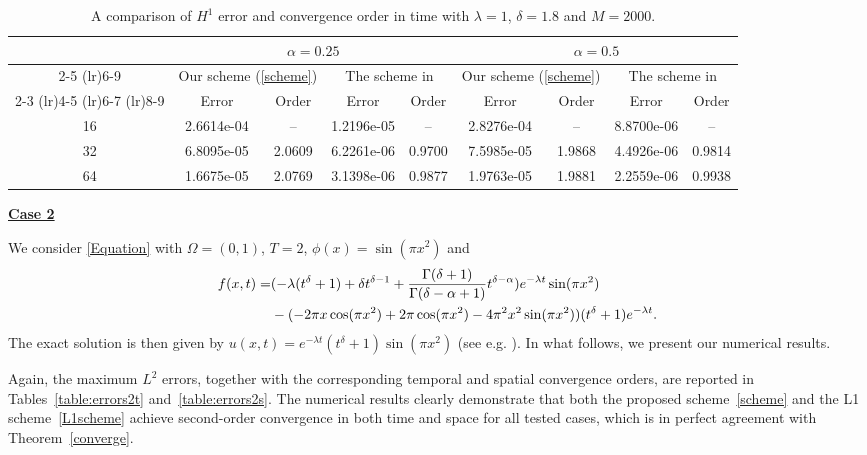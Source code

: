 \documentclass[10pt, reqno]{amsart}
\theoremstyle{remark}
\theoremstyle{definition}
\numberwithin{table}{section}
\begin{document}
\begin{table}[htbp]
\centering
\caption{A comparison of $H^1$ error and convergence order in time with $\lambda=1$, $\delta=1.8$ and $M=2000$.}
\label{table:errors2.2}
\begin{tabular}{c c c c c c c c c}
\toprule
& \multicolumn{4}{c}{$\alpha=0.25$} 
& \multicolumn{4}{c}{$\alpha=0.5$} \\
\cmidrule(lr){2-5} \cmidrule(lr){6-9}
 & \multicolumn{2}{c}{Our scheme (\ref{scheme})} & \multicolumn{2}{c}{The scheme in \cite{cao2020}}   
 & \multicolumn{2}{c}{Our scheme (\ref{scheme})} & \multicolumn{2}{c}{The scheme in \cite{cao2020}} \\
\cmidrule(lr){2-3} \cmidrule(lr){4-5} \cmidrule(lr){6-7} \cmidrule(lr){8-9}
\multirow{1}{*}{$N$}
 & Error & Order & Error & Order & Error & Order & Error  & Order \\
\midrule
16 
& 2.6614e-04  & --   
& 1.2196e-05 & -- 
& 2.8276e-04 & -- 
& 8.8700e-06 & -- \\
32 
& 6.8095e-05 & 2.0609 
& 6.2261e-06 & 0.9700 
& 7.5985e-05 & 1.9868 
& 4.4926e-06 & 0.9814 \\
64  
& 1.6675e-05  & 2.0769 
& 3.1398e-06 & 0.9877 
& 1.9763e-05 & 1.9881 
& 2.2559e-06 & 0.9938 \\
\bottomrule
\end{tabular}
\end{table}


\noindent\textbf{\underline{Case 2}}

 We consider \eqref{Equation} with $\Omega=(0,1)$, $T=2$, $\phi(x)=\sin (\pi x^2)$ and 
\begin{align}
f(x,t) = & ( -\lambda (t^\delta + 1) + \delta t^{\delta - 1} + \frac{\Gamma(\delta+1)}{\Gamma(\delta-\alpha+1)} t^{\delta-\alpha} ) e^{-\lambda t} \sin(\pi x^2) \notag\\
& - ( -2\pi x\cos(\pi x^2)+2\pi\cos(\pi x^2)-4\pi^2x^2\sin(\pi x^2) ) (t^\delta + 1) e^{-\lambda t}.\notag
\end{align}
The exact solution is then given by $u(x,t) = e^{-\lambda t} (t^\delta + 1) \sin(\pi x^2)$ (see e.g. \cite{cao2020,dwivedi2024,stynes2017,zhu2019}). In what follows, we present our numerical results. 

Again, the maximum $L^2$ errors, together with the corresponding temporal and spatial convergence orders, are reported in Tables~\ref{table:errors2t} and~\ref{table:errors2s}. The numerical results clearly demonstrate that both the proposed scheme~\eqref{scheme} and the L1 scheme~\eqref{L1scheme} achieve second-order convergence in both time and space for all tested cases, which is in perfect agreement with Theorem~\ref{converge}.
\end{document}
